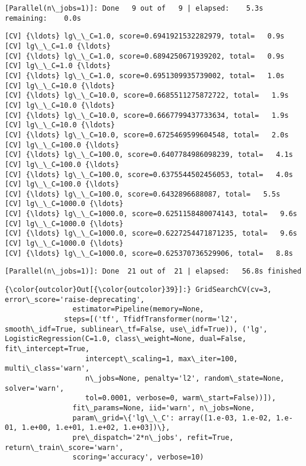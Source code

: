 \documentclass[11pt]{article}
\begin{document}
    \begin{Verbatim}[commandchars=\\\{\}]
[Parallel(n\_jobs=1)]: Done   9 out of   9 | elapsed:    5.3s remaining:    0.0s

    \end{Verbatim}

    \begin{Verbatim}[commandchars=\\\{\}]
[CV] {\ldots} lg\_\_C=1.0, score=0.6941921532282979, total=   0.9s
[CV] lg\_\_C=1.0 {\ldots}
[CV] {\ldots} lg\_\_C=1.0, score=0.6894250671939202, total=   0.9s
[CV] lg\_\_C=1.0 {\ldots}
[CV] {\ldots} lg\_\_C=1.0, score=0.6951309935739002, total=   1.0s
[CV] lg\_\_C=10.0 {\ldots}
[CV] {\ldots} lg\_\_C=10.0, score=0.6685511275872722, total=   1.9s
[CV] lg\_\_C=10.0 {\ldots}
[CV] {\ldots} lg\_\_C=10.0, score=0.6667799437733634, total=   1.9s
[CV] lg\_\_C=10.0 {\ldots}
[CV] {\ldots} lg\_\_C=10.0, score=0.6725469599604548, total=   2.0s
[CV] lg\_\_C=100.0 {\ldots}
[CV] {\ldots} lg\_\_C=100.0, score=0.6407784986098239, total=   4.1s
[CV] lg\_\_C=100.0 {\ldots}
[CV] {\ldots} lg\_\_C=100.0, score=0.6375544502456053, total=   4.0s
[CV] lg\_\_C=100.0 {\ldots}
[CV] {\ldots} lg\_\_C=100.0, score=0.6432896688087, total=   5.5s
[CV] lg\_\_C=1000.0 {\ldots}
[CV] {\ldots} lg\_\_C=1000.0, score=0.6251158480074143, total=   9.6s
[CV] lg\_\_C=1000.0 {\ldots}
[CV] {\ldots} lg\_\_C=1000.0, score=0.6227254471871235, total=   9.6s
[CV] lg\_\_C=1000.0 {\ldots}
[CV] {\ldots} lg\_\_C=1000.0, score=0.625370736529906, total=   8.8s

    \end{Verbatim}

    \begin{Verbatim}[commandchars=\\\{\}]
[Parallel(n\_jobs=1)]: Done  21 out of  21 | elapsed:   56.8s finished

    \end{Verbatim}

\begin{Verbatim}[commandchars=\\\{\}]
{\color{outcolor}Out[{\color{outcolor}39}]:} GridSearchCV(cv=3, error\_score='raise-deprecating',
                estimator=Pipeline(memory=None,
              steps=[('tf', TfidfTransformer(norm='l2', smooth\_idf=True, sublinear\_tf=False, use\_idf=True)), ('lg', LogisticRegression(C=1.0, class\_weight=None, dual=False, fit\_intercept=True,
                   intercept\_scaling=1, max\_iter=100, multi\_class='warn',
                   n\_jobs=None, penalty='l2', random\_state=None, solver='warn',
                   tol=0.0001, verbose=0, warm\_start=False))]),
                fit\_params=None, iid='warn', n\_jobs=None,
                param\_grid=\{'lg\_\_C': array([1.e-03, 1.e-02, 1.e-01, 1.e+00, 1.e+01, 1.e+02, 1.e+03])\},
                pre\_dispatch='2*n\_jobs', refit=True, return\_train\_score='warn',
                scoring='accuracy', verbose=10)
\end{Verbatim}
            
\end{document}
